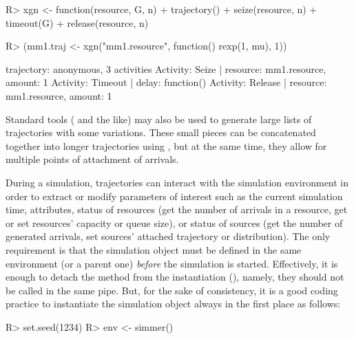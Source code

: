 \documentclass[
  nojss]{jss}
\begin{document}
\begin{CodeChunk}
\begin{CodeInput}
R> xgn <- function(resource, G, n)
+   trajectory() %
+     seize(resource, n) %
+     timeout(G) %
+     release(resource, n)
\end{CodeInput}
\end{CodeChunk}

\begin{CodeChunk}
\begin{CodeInput}
R> (mm1.traj <- xgn("mm1.resource", function() rexp(1, mu), 1))
\end{CodeInput}
\begin{CodeOutput}
trajectory: anonymous, 3 activities
{ Activity: Seize        | resource: mm1.resource, amount: 1 }
{ Activity: Timeout      | delay: function() }
{ Activity: Release      | resource: mm1.resource, amount: 1 }
\end{CodeOutput}
\end{CodeChunk}

Standard  tools ( and the like) may also be
used to generate large lists of trajectories with some variations. These
small pieces can be concatenated together into longer trajectories using
, but at the same time, they allow for multiple points of
attachment of arrivals.

During a simulation, trajectories can interact with the simulation
environment in order to extract or modify parameters of interest such as
the current simulation time, attributes, status of resources (get the
number of arrivals in a resource, get or set resources' capacity or
queue size), or status of sources (get the number of generated arrivals,
set sources' attached trajectory or distribution). The only requirement
is that the simulation object must be defined in the same 
environment (or a parent one) \emph{before} the simulation is started.
Effectively, it is enough to detach the  method from the
instantiation (), namely, they should not be called in
the same pipe. But, for the sake of consistency, it is a good coding
practice to instantiate the simulation object always in the first place
as follows:

\begin{CodeChunk}
\begin{CodeInput}
R> set.seed(1234)
R> env <- simmer()
\end{CodeInput}
\end{CodeChunk}
\end{document}
